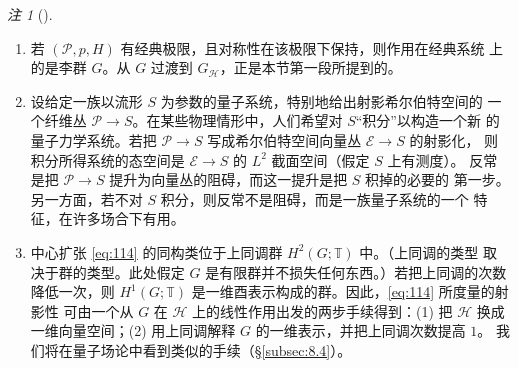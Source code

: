\documentclass[11pt]{amsart}
\theoremstyle{definition}
\theoremstyle{remark}
\newtheorem{remark}[equation]{注}
\theoremstyle{plain}
\numberwithin{equation}{section}
\renewcommand{\:}{\colon}
\newcommand{\TT}{\mathbb T}
\newcommand{\sE}{\mathscr{E}}
\newcommand{\sH}{\mathscr{H}}
\newcommand{\sP}{\mathscr{P}}
\begin{document}
   \begin{remark}[]\label{thm:27}
 \ 

 \begin{enumerate}%


 \item 若 $(\sP,p,H)$ 有经典极限，且对称性在该极限下保持，则作用在经典系统
 上的是李群 $G$。从 $G$ 过渡到 $G_\sH$，正是本节第一段所提到的。


 \item 设给定一族以流形 $S$ 为参数的量子系统，特别地给出射影希尔伯特空间的
 一个纤维丛 $\sP\to S$。在某些物理情形中，人们希望对 $S$“积分”以构造一个新
 的量子力学系统。若把 $\sP\to S$ 写成希尔伯特空间向量丛 $\sE\to S$ 的射影化，
 则积分所得系统的态空间是 $\sE\to S$ 的 $L^2$ 截面空间（假定 $S$ 上有测度）。
 反常是把 $\sP\to S$ 提升为向量丛的阻碍，而这一提升是把 $S$ 积掉的必要的
 第一步。另一方面，若不对 $S$ 积分，则反常不是阻碍，而是一族量子系统的一个
 特征，在许多场合下有用。



 \item 中心扩张 \eqref{eq:114} 的同构类位于上同调群 $H^2(G;\TT)$ 中。（上同调的类型
 取决于群的类型。此处假定 $G$ 是有限群并不损失任何东西。）若把上同调的次数
 降低一次，则 $H^1(G;\TT)$ 是一维酉表示构成的群。因此，\eqref{eq:114} 所度量的射影性
 可由一个从 $G$ 在 $\sH$ 上的线性作用出发的两步手续得到：(1) 把 $\sH$ 换成
 一维向量空间；(2) 用上同调解释 $G$ 的一维表示，并把上同调次数提高 $1$。
 我们将在量子场论中看到类似的手续（§\ref{subsec:8.4}）。

 \end{enumerate}
   \end{remark}
\end{document}
